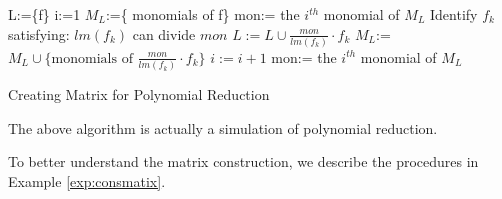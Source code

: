 \begin{algorithm}[hbt]
\SetAlgoNoLine

	L:=\{f\} \;{}
	i:=1\;
	$M_{L}$:=\{ monomials of f\} \;{}
	mon:= the $i^{th}$ monomial of $M_{L}$\;
		{
			Identify $f_{k}$ satisfying: $lm(f_{k})$ can divide $mon$ \;
			$L:=L \cup \frac{mon}{lm(f_{k})}\cdot f_{k}$ \;
			$M_{L}$:=$M_{L} \cup \{ \text{monomials of } \frac{mon}{lm(f_{k})}\cdot f_{k}\}$ \;{}
			$i:=i+1$\;{}
			mon:= the $i^{th}$ monomial of $M_{L}$\;
		}
\caption{Creating Matrix for Polynomial Reduction}\label{alg:matrix}
\end{algorithm}

The above algorithm is actually a simulation of polynomial reduction. 

To better understand the matrix construction, we describe the procedures in Example \ref{exp:consmatix}.


